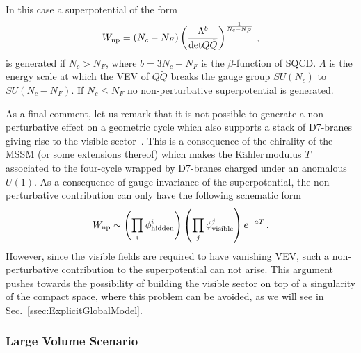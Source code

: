 \documentclass[12pt,a4paper]{book}
\newcommand{\Kahler}{\ensuremath{\text{K}\ddot{\text{a}}\text{hler}\,}}
\begin{document}
\begin{itemize}
\begin{itemize}
 In this case a superpotential of the form
 \begin{align}
 \label{eq:SuperpotentialYMMatter}
 W_{\rm np} = \left(N_c - N_F\right) \left(\frac{\Lambda^b}{\text{det} Q \tilde{Q}}\right)^{\frac{1}{N_c - N_F}}\,,
 \end{align}
is generated if $N_c > N_F$, where $b = 3 N_c - N_F$ is the $\beta$-function of SQCD. $\Lambda$ is the energy scale at which the VEV of $Q \tilde{Q}$ breaks the gauge group $SU(N_c)$ to $SU(N_c - N_F)$. If $N_c \leq N_F$ no non-perturbative superpotential is generated.
 \end{itemize}
\end{itemize}

As a final comment, let us remark that it is not possible to generate a non-perturbative effect on a geometric cycle which also supports a stack of D7-branes giving rise to the visible sector~\cite{Blumenhagen:2007sm}. This is a consequence of the chirality of the MSSM (or some extensions thereof) which makes the \Kahler modulus $T$ associated to the four-cycle wrapped by D7-branes charged under an anomalous $U(1)$. As a consequence of gauge invariance of the superpotential, the non-perturbative contribution can only have the following schematic form~\cite{Conlon:2008wa}
\begin{align}
\label{eq:NPSuperpotentialMatter}
W_{\rm np} \sim \left(\prod_i \phi^i_{\rm hidden}\right) \left(\prod_j \phi^j_{\rm visible}\right) e^{-a T}\,.
\end{align}
However, since the visible fields are required to have vanishing VEV, such a non-perturbative contribution to the superpotential can not arise. This argument pushes towards the possibility of building the visible sector on top of a singularity of the compact space, where this problem can be avoided, as we will see in Sec.~\ref{ssec:ExplicitGlobalModel}.


\subsubsection{Large Volume Scenario}
\label{sssec:LVS}
\end{document}
